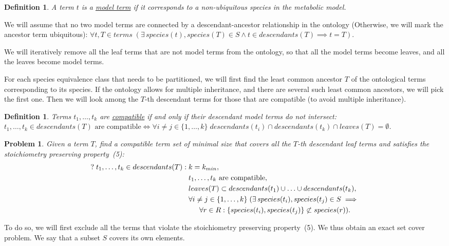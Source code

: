 \documentclass[10pt]{bmc_article}
\newenvironment{bmcformat}{\baselineskip20pt\sloppy\setboolean{publ}{false}}{\baselineskip20pt\sloppy}
\begin{document}
\begin{bmcformat}
\newtheorem{mt}[def]{Definition}
\begin{mt}
A term $t$ is a \underline{model term} if it corresponds to a non-ubiquitous species in the metabolic model. 
\end{mt}
We will assume that no two model terms are connected by a descendant-ancestor relationship in the ontology (Otherwise, we will mark the ancestor term ubiquitous): $\forall t, T \in terms \; (\exists\, species(t), species(T) \in S \land t \in descendants(T) \implies t = T)$.

We will iteratively remove all the leaf terms that are not model terms from the ontology, so that all the model terms become leaves, and all the leaves become model terms. 

For each species equivalence class that needs to be partitioned, we will first find the least common ancestor $T$ of the ontological terms corresponding to its species. If the ontology allows for multiple inheritance, and there are several such least common ancestors, we will pick the first one. Then we will look among the $T$-th descendant terms for those that are compatible (to avoid multiple inheritance).

\newtheorem{comp}[def]{Definition}
\begin{comp}
Terms $ t_1, \ldots, t_k$ are \underline{compatible} if and only if their descendant model terms do not intersect:
$ t_1, \ldots, t_k \in descendants(T) \text{ are compatible} \iff \forall i \neq j \in \{1, \ldots, k\} \; descendants(t_i) \cap descendants(t_k) \cap leaves(T) = \emptyset$.
\end{comp}

\newtheorem{pp}[pbm]{Problem}
\begin{pp}
Given a term $T$, find a compatible term set of minimal size that covers all the $T$-th descendant leaf terms and satisfies the stoichiometry preserving property~(5):
\begin{align}
\nonumber ?\; t_1, \ldots, t_k \in descendants(T):\; & k = k_{min},\\
&t_1, \ldots, t_k \text{ are compatible},\\
&leaves(T) \subset descendants(t_1) \cup \ldots \cup descendants(t_k) ,\\
&\forall i \neq j \in \{1, \ldots, k\}\; (\exists\, species(t_i), species(t_j) \in S \implies \\
\nonumber &\indent \forall r \in R: \{species(t_i), species(t_j)\} \not \subset species(r)).
\end{align}
\end{pp}
To do so, we will first exclude all the terms that violate the stoichiometry preserving property~(5). We thus obtain an exact set cover problem. We say that a subset $S$ covers its own elements.


\end{bmcformat}
\end{document}
